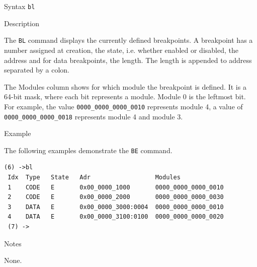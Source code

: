 %
%
\pagebreak
{}

\begin{iPageDescEntry}{Syntax}
\texttt{bl  }
\end{iPageDescEntry}

\begin{iPageDescEntry}{Description}

The \texttt{BL} command displays the currently defined breakpoints. A breakpoint has a number assigned at creation, the state, i.e. whether enabled or disabled, the address and for data breakpoints, the length. The length is appended to address separated by a colon.

The Modules column shows for which module the breakpoint is defined. It is a 64-bit mask, where each bit represents a module. Module 0 is the leftmost bit. For example, the value \texttt{0000\_0000\_0000\_0010} represents module 4, a 
    value of \texttt{0000\_0000\_0000\_0018} represents module 4 and module 3.

\end{iPageDescEntry}

\begin{iPageDescEntry}{Example}

The following examples demonstrate the \texttt{BE} command. 

\begin{lstlisting}[style=iPageOpStyle]
 (6) ->bl
 Idx  Type   State   Adr                  Modules         
 1    CODE   E       0x00_0000_1000       0000_0000_0000_0010
 2    CODE   E       0x00_0000_2000       0000_0000_0000_0030
 3    DATA   E       0x00_0000_3000:0004  0000_0000_0000_0010
 4    DATA   E       0x00_0000_3100:0100  0000_0000_0000_0020
 (7) ->
\end{lstlisting}
\end{iPageDescEntry}

\begin{iPageDescEntry}{Notes}

None.

\end{iPageDescEntry}